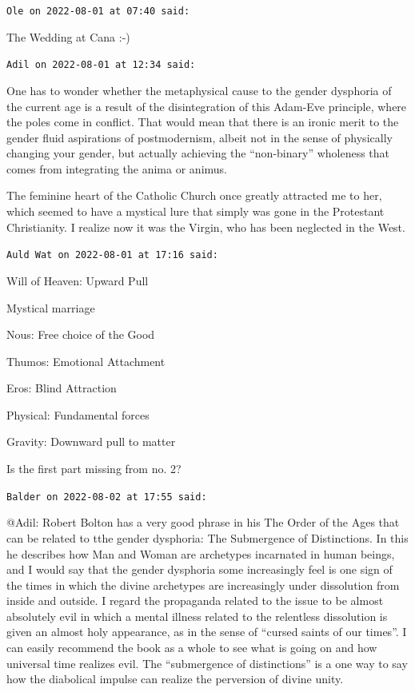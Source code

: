 \begin{footnotesize}
\begin{sffamily}
\texttt{Ole on 2022-08-01 at 07:40 said:}

The Wedding at Cana :-)

\hfill

\texttt{Adil on 2022-08-01 at 12:34 said:}

One has to wonder whether the metaphysical cause to the gender dysphoria of the current age is a result of the disintegration of this Adam-Eve principle, where the poles come in conflict. That would mean that there is an ironic merit to the gender fluid aspirations of postmodernism, albeit not in the sense of physically changing your gender, but actually achieving the ``non-binary'' wholeness that comes from integrating the anima or animus.

The feminine heart of the Catholic Church once greatly attracted me to her, which seemed to have a mystical lure that simply was gone in the Protestant Christianity. I realize now it was the Virgin, who has been neglected in the West.

\hfill

\texttt{Auld Wat on 2022-08-01 at 17:16 said:}

Will of Heaven: Upward Pull

Mystical marriage

Nous: Free choice of the Good

Thumos: Emotional Attachment

Eros: Blind Attraction

Physical: Fundamental forces

Gravity: Downward pull to matter

Is the first part missing from no. 2?

\hfill

\texttt{Balder on 2022-08-02 at 17:55 said:}

@Adil: Robert Bolton has a very good phrase in his The Order of the Ages that can be related to tthe gender dysphoria: The Submergence of Distinctions. In this he describes how Man and Woman are archetypes incarnated in human beings, and I would say that the gender dysphoria some increasingly feel is one sign of the times in which the divine archetypes are increasingly under dissolution from inside and outside. I regard the propaganda related to the issue to be almost absolutely evil in which a mental illness related to the relentless dissolution is given an almost holy appearance, as in the sense of ``cursed saints of our times''. I can easily recommend the book as a whole to see what is going on and how universal time realizes evil. The ``submergence of distinctions'' is a one way to say how the diabolical impulse can realize the perversion of divine unity.


\hfill

\end{sffamily}
\end{footnotesize}

